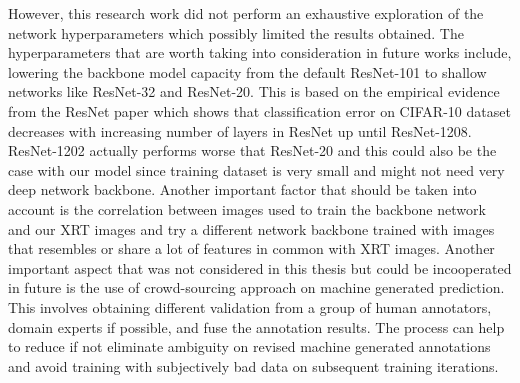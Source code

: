 \documentclass[conference]{IEEEtran}
\begin{document}
	However, this research work did not perform an exhaustive exploration of the network
hyperparameters which possibly limited the results obtained. The hyperparameters that
are worth taking into consideration in future works include, lowering the backbone model
capacity from the default ResNet-101 to shallow networks like ResNet-32 and ResNet-20. This is based on the empirical evidence from the ResNet paper\cite{Ren} which shows that
classification error on CIFAR-10 dataset decreases with increasing number of layers in
ResNet up until ResNet-1208. ResNet-1202 actually performs worse that ResNet-20 and
this could also be the case with our model since training dataset is very small and might
not need very deep network backbone. Another important factor that should be taken into
account is the correlation between images used to train the backbone network and our XRT
images and try a different network backbone trained with images that resembles or share a
lot of features in common with XRT images.
Another important aspect that was not considered in this thesis but could be incooperated
in future is the use of crowd-sourcing approach on machine generated prediction. This
involves obtaining different validation from a group of human annotators, domain experts
if possible, and fuse the annotation results. The process can help to reduce if not eliminate
ambiguity on revised machine generated annotations and avoid training with subjectively
bad data on subsequent training iterations.
\end{document}
